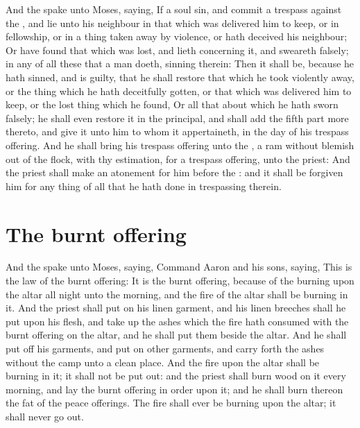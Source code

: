 \begin{biblechapter} %
\verse And the \LORD spake unto Moses, saying,
\verse If a soul sin, and commit a trespass against the \LORD, and lie unto his neighbour in that which was delivered him to keep, or in fellowship, or in a thing taken away by violence, or hath deceived his neighbour;
\verse Or have found that which was lost, and lieth concerning it, and sweareth falsely; in any of all these that a man doeth, sinning therein:
\verse Then it shall be, because he hath sinned, and is guilty, that he shall restore that which he took violently away, or the thing which he hath deceitfully gotten, or that which was delivered him to keep, or the lost thing which he found,
\verse Or all that about which he hath sworn falsely; he shall even restore it in the principal, and shall add the fifth part more thereto, and give it unto him to whom it appertaineth, in the day of his trespass offering.
\verse And he shall bring his trespass offering unto the \LORD, a ram without blemish out of the flock, with thy estimation, for a trespass offering, unto the priest:
\verse And the priest shall make an atonement for him before the \LORD: and it shall be forgiven him for any thing of all that he hath done in trespassing therein.
\section*{The burnt offering}
\verse And the \LORD spake unto Moses, saying,
\verse Command Aaron and his sons, saying, This is the law of the burnt offering: It is the burnt offering, because of the burning upon the altar all night unto the morning, and the fire of the altar shall be burning in it.
\verse And the priest shall put on his linen garment, and his linen breeches shall he put upon his flesh, and take up the ashes which the fire hath consumed with the burnt offering on the altar, and he shall put them beside the altar.
\verse And he shall put off his garments, and put on other garments, and carry forth the ashes without the camp unto a clean place.
\verse And the fire upon the altar shall be burning in it; it shall not be put out: and the priest shall burn wood on it every morning, and lay the burnt offering in order upon it; and he shall burn thereon the fat of the peace offerings.
\verse The fire shall ever be burning upon the altar; it shall never go out.

\end{biblechapter}
